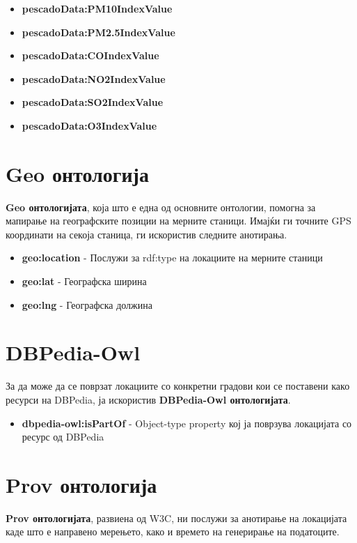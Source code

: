 \documentclass{uvamscse}
\begin{document}
\begin{itemize}
\item \textbf{pescadoData:PM10IndexValue}
\item \textbf{pescadoData:PM2.5IndexValue}
\item \textbf{pescadoData:COIndexValue}
\item \textbf{pescadoData:NO2IndexValue}
\item \textbf{pescadoData:SO2IndexValue}
\item \textbf{pescadoData:O3IndexValue}
\end{itemize}


\section{Geo онтологија}

\textbf{Geo онтологијата}, која што е една од основните онтологии, помогна за мапирање на географските позиции на мерните станици. Имајќи ги точните GPS координати на секоја станица, ги искористив следните анотирања.

\begin{itemize}
\item \textbf{geo:location} - Послужи за rdf:type на локациите на мерните станици
\item \textbf{geo:lat} - Географска ширина
\item \textbf{geo:lng} - Географска должина
\end{itemize}

\section{DBPedia-Owl}

За да може да се поврзат локациите со конкретни градови кои се поставени како ресурси на DBPedia, ја искористив \textbf{DBPedia-Owl онтологијата}.

\begin{itemize}
\item \textbf{dbpedia-owl:isPartOf} - Object-type property кој ја поврзува локацијата со ресурс од DBPedia
\end{itemize}

\section{Prov онтологија}

\textbf{Prov онтологијата}, развиена од W3C, ни послужи за анотирање на локацијата каде што е направено мерењето, како и времето на генерирање на податоците.
\end{document}

